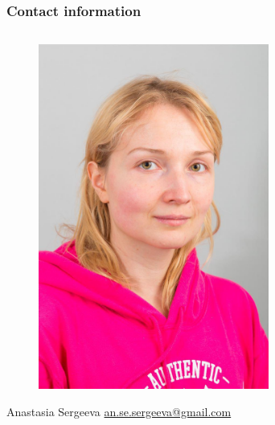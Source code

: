 \documentclass[11pt,xcolor=x11names,compress]{beamer}
\renewcommand{\(}{\begin{columns}}
\renewcommand{\)}{\end{columns}}
\newcommand{\<}[1]{\begin{column}{#1}}
\renewcommand{\>}{\end{column}}
\begin{document}
\begin{frame}
	\frametitle{Contact information}
	\begin{columns}
	\begin{column}{0.33\textwidth}
		\small
		\begin{figure}
			\includegraphics[width=0.8\textwidth]{Asya.png}
		\end{figure}
		\centering
		Anastasia Sergeeva \newline
		\url{an.se.sergeeva@gmail.com}
	\end{column}
	\begin{column}{0.33\textwidth}
		\small
		\begin{figure}

\end{figure}
\end{column}
\end{columns}
\end{frame}
\end{document}
